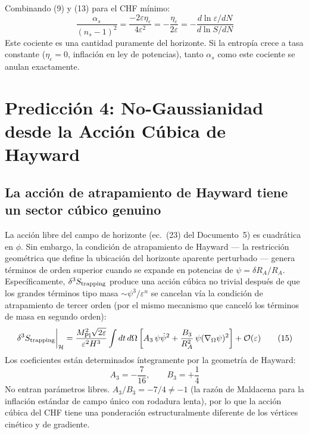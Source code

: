 \documentclass[12pt,a4paper]{article}
\begin{document}
Combinando (9) y (13) para el CHF mínimo:
\begin{equation}
\frac{\alpha_s}{(n_s - 1)^2} = \frac{-2\varepsilon\eta_\varepsilon}{4\varepsilon^2} = -\frac{\eta_\varepsilon}{2\varepsilon} = -\frac{d\ln\varepsilon/dN}{d\ln S/dN} \tag{14}
\end{equation}
Este cociente es una cantidad puramente del horizonte. Si la entropía crece a tasa constante ($\eta_\varepsilon = 0$, inflación en ley de potencias), tanto $\alpha_s$ como este cociente se anulan exactamente.

\section{Predicción 4: No-Gaussianidad desde la Acción Cúbica de Hayward}

\subsection{La acción de atrapamiento de Hayward tiene un sector cúbico genuino}

La acción libre del campo de horizonte (ec.~(23) del Documento~5) es cuadrática en $\phi$. Sin embargo, la condición de atrapamiento de Hayward --- la restricción geométrica que define la ubicación del horizonte aparente perturbado --- genera términos de orden superior cuando se expande en potencias de $\psi = \delta R_A/R_A$. Específicamente, $\delta^3 S_{\rm trapping}$ produce una acción cúbica no trivial después de que los grandes términos tipo masa $\sim\psi^3/\varepsilon^n$ se cancelan vía la condición de atrapamiento de tercer orden (por el mismo mecanismo que canceló los términos de masa en segundo orden):
\begin{equation}
\delta^3 S_{\rm trapping}\bigg|_{\mathcal{H}} = \frac{M_{\rm Pl}^2\sqrt{2\varepsilon}}{\varepsilon^2 H^3}\int dt\,d\Omega\left[A_3\,\psi\dot\psi^2 + \frac{B_3}{R_A^2}\,\psi(\nabla_\Omega\psi)^2\right] + \mathcal{O}(\varepsilon) \tag{15}
\end{equation}
Los coeficientes están determinados íntegramente por la geometría de Hayward:
\begin{equation}
A_3 = -\frac{7}{16}, \qquad B_3 = +\frac{1}{4} \tag{16}
\end{equation}
No entran parámetros libres. $A_3/B_3 = -7/4 \neq -1$ (la razón de Maldacena para la inflación estándar de campo único con rodadura lenta), por lo que la acción cúbica del CHF tiene una ponderación estructuralmente diferente de los vértices cinético y de gradiente.
\end{document}
